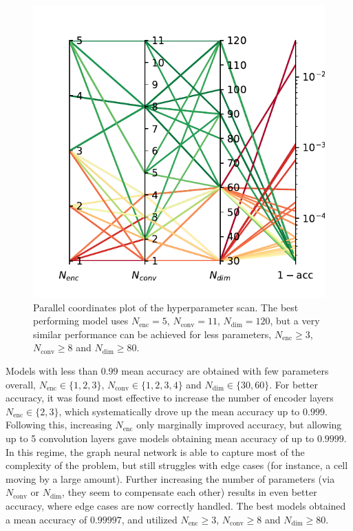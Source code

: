 \documentclass[10pt,conference,compsocconf,a4paper]{IEEEtran}
\begin{document}
		\begin{figure}
			\centering
			\includegraphics[width=\linewidth]{figures/hparams.pdf}
			\caption{Parallel coordinates plot of the hyperparameter scan. The best performing model uses $N_\textrm{enc}=5$, $N_\textrm{conv}=11$, $N_\textrm{dim}=120$, but a very similar performance can be achieved for less parameters, $N_\textrm{enc} \geq 3$, $N_\textrm{conv} \geq 8$ and $N_\textrm{dim} \geq 80$.}
			\label{fig:hparams}
		\end{figure}

		Models with less than $0.99$ mean accuracy are obtained with few parameters overall, $N_\textrm{enc} \in \{1,2,3\}$, $N_\textrm{conv} \in \{1,2,3,4\}$ and $N_\textrm{dim} \in \{30, 60\}$. For better accuracy, it was found most effective to increase the number of encoder layers $N_\textrm{enc} \in \{2,3\}$, which systematically drove up the mean accuracy up to $0.999$. Following this, increasing $N_\textrm{enc}$ only marginally improved accuracy, but allowing up to 5 convolution layers gave models obtaining mean accuracy of up to $0.9999$. In this regime, the graph neural network is able to capture most of the complexity of the problem, but still struggles with edge cases (for instance, a cell moving by a large amount). Further increasing the number of parameters (via $N_\textrm{conv}$ or $N_\textrm{dim}$, they seem to compensate each other) results in even better accuracy, where edge cases are now correctly handled. The best models obtained a mean accuracy of $0.99997$, and utilized $N_\textrm{enc} \geq 3$, $N_\textrm{conv} \geq 8$ and $N_\textrm{dim} \geq 80$.
\end{document}
